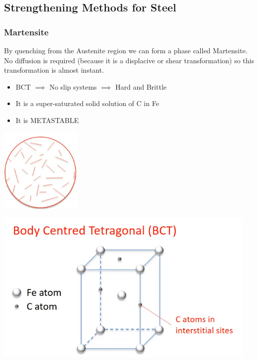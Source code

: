 \documentclass[12pt]{article}
\begin{document}
\subsection{Strengthening Methods for Steel}
\subsubsection{Martensite}
By quenching from the Austenite region we can form a phase called Martensite.
No diffusion is required (because it is a displacive or shear transformation) so this transformation is almost instant.

\begin{itemize}
  \item BCT $\implies$ No slip systems $\implies$ Hard and Brittle
  \item It is a super-saturated solid solution of C in Fe
  \item It is METASTABLE
\end{itemize}

\begin{marginfigure}
  \vspace{-1cm}
  \includegraphics[scale=0.3]{martensitestructure}
\end{marginfigure}

\begin{marginfigure}
  \vspace{-2cm}
  \includegraphics[scale=0.3]{martensitecell}
\end{marginfigure}
\end{document}
